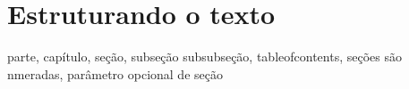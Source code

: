 \section{Estruturando o texto}

parte, capítulo, seção, subseção subsubseção, tableofcontents, seções
são nmeradas, parâmetro opcional de seção


